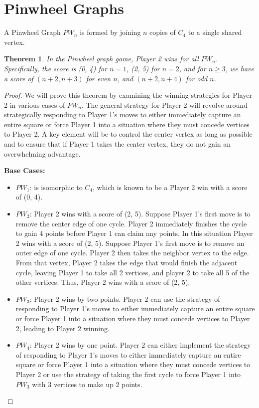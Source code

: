 \documentclass{article}
\newtheorem{theorem}{Theorem}
\begin{document}
\section{Pinwheel Graphs}
A Pinwheel Graph $PW_n$ is formed by joining $n$ copies of $C_4$ to a single shared vertex.
\begin{theorem}
    In the Pinwheel graph game, Player 2 wins for all $PW_n$.  Specifically, the score is (0, 4) for $n = 1$, (2, 5) for $n = 2$, and for $n \geq 3$, we have a score of $(n + 2, n + 3)$ for even $n$, and $(n + 2, n + 4)$ for odd $n$.
\end{theorem}
\begin{proof}
    We will prove this theorem by examining the winning strategies for Player 2 in various cases of $PW_n$. The general strategy for Player 2 will revolve around strategically responding to Player 1's moves to either immediately capture an entire square or force Player 1 into a situation where they must concede vertices to Player 2.  A key element will be to control the center vertex as long as possible and to ensure that if Player 1 takes the center vertex, they do not gain an overwhelming advantage.
    
    \textbf{Base Cases:}

    \begin{itemize}
        \item $PW_1$: is isomorphic to $C_4$, which is known to be a Player 2 win with a score of (0, 4).
        \item $PW_2$: Player 2 wins with a score of (2, 5). Suppose Player 1's first move is to remove the center edge of one cycle. Player 2 immediately finishes the cycle to gain 4 points before Player 1 can claim any points.  In this situation Player 2 wins with a score of (2, 5). Suppose Player 1's first move is to remove an outer edge of one cycle. Player 2 then takes the neighbor vertex to the edge. From that vertex, Player 2 takes the edge that would finish the adjacent cycle, leaving Player 1 to take all 2 vertices, and player 2 to take all 5 of the other vertices. Thus, Player 2 wins with a score of (2, 5). 
        \item $PW_3$: Player 2 wins by two points. Player 2 can use the strategy of responding to Player 1's moves to either immediately capture an entire square or force Player 1 into a situation where they must concede vertices to Player 2, leading to Player 2 winning.
        \item $PW_4$: Player 2 wins by one point. Player 2 can either implement the strategy of responding to Player 1's moves to either immediately capture an entire square or force Player 1 into a situation where they must concede vertices to Player 2 or use the strategy of taking the first cycle to force Player 1 into $PW_3$ with 3 vertices to make up 2 points.
    \end{itemize}
    

\end{proof}
\end{document}
